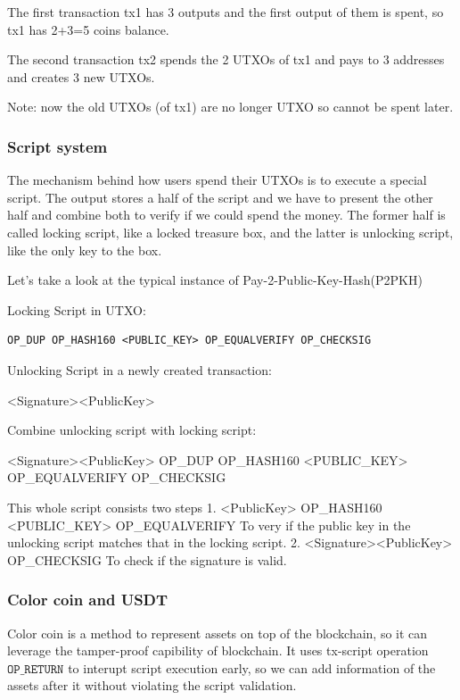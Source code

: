 \documentclass[a4paper,11pt]{article}
\begin{document}
The first transaction tx1 has 3 outputs and the first output of them is spent, so  tx1 has 2+3=5 coins balance. 

The second transaction tx2 spends the 2 UTXOs of tx1 and pays to 3 addresses and creates 3 new UTXOs. 

Note: now the old UTXOs (of tx1) are no longer UTXO so cannot be spent later.  

\subsubsection{Script system}

The mechanism behind how users spend their UTXOs is to execute a special script. The output stores a half of the script and we have to present the other half and combine both to verify if we could spend the money. The former half is called locking script, like a locked treasure box, and the latter is unlocking script, like the only key to the box.

Let's take a look at the typical instance of  Pay-2-Public-Key-Hash(P2PKH)

Locking Script in UTXO:

\begin{lstlisting}
OP_DUP OP_HASH160 <PUBLIC_KEY> OP_EQUALVERIFY OP_CHECKSIG
\end{lstlisting}

Unlocking Script in a newly created transaction:

<Signature><PublicKey>

Combine unlocking script with locking script:

<Signature><PublicKey> OP\_DUP OP\_HASH160 <PUBLIC\_KEY> OP\_EQUALVERIFY OP\_CHECKSIG

This whole script consists two steps
1. <PublicKey>  OP\_HASH160 <PUBLIC\_KEY> OP\_EQUALVERIFY
	To very if the public key in the unlocking script matches that in the locking script.
2.  <Signature><PublicKey> OP\_CHECKSIG
	To check if the signature is valid.


\subsubsection{Color coin and USDT}

Color coin is a method to represent assets on top of the blockchain, so it can leverage the tamper-proof capibility of blockchain. It uses tx-script operation $\texttt{OP\_RETURN}$ to interupt script execution early, so we can add information of the assets after it without violating the script validation.
\end{document}
